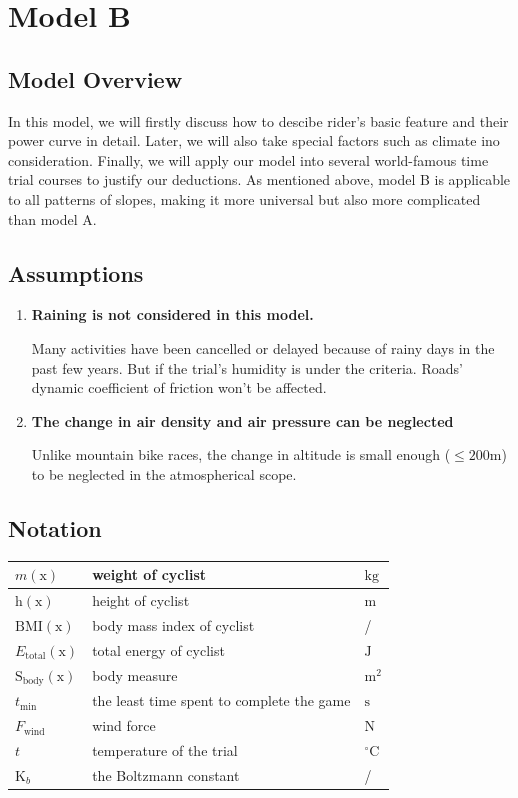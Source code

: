 \documentclass{article}
\begin{document}
	\section{Model B}
		\subsection{Model Overview}
			In this model, we will firstly discuss how to descibe rider's basic feature and their power curve in detail. Later, we will also take special factors such as climate ino consideration. Finally, we will apply our model into several world-famous time trial courses to justify our deductions. As mentioned above, model B is applicable to all patterns of slopes, making it more universal but also more complicated than model A.
		\subsection{Assumptions}
			\begin{enumerate}
				\item	\textbf{Raining is not considered in this model.}

						Many activities have been cancelled or delayed because of rainy days in the past few years. But if the trial's humidity is under the criteria. Roads' dynamic coefficient of friction won't be affected.
				\item \textbf{The change in air density and air pressure can be neglected}

						Unlike mountain bike races, the change in altitude is small enough (\(\leq 200\mathrm{m}\)) to be neglected in the atmospherical scope.

			\end{enumerate}
		\subsection{Notation}
			\begin{tabular}{|l|l|l|}
				\hline
				$m(\mathrm{x})$&weight of cyclist&$\mathrm{kg}$\\
				\hline
				$\mathrm{h}(\mathrm{x})$&height of cyclist&$\mathrm{m}$\\
				\hline
				$\mathrm{BMI}(\mathrm{x})$&body mass index of cyclist&/\\
				\hline
				$ E _\mathrm{total} (\mathrm{x})$&total energy of cyclist&$\mathrm{J}$\\
				\hline
				$\mathrm{S}_\mathrm{body}(\mathrm{x})$&body measure&$\mathrm{m}^2$\\
				\hline
				$t_\mathrm{min}$&the least time spent to complete the game&$\mathrm{s}$\\
				\hline
				$F_\mathrm{wind}$&wind force&$\mathrm{N}$\\
				\hline
				$t$&temperature of the trial&$^\circ\mathrm{C}$\\
				\hline
				$\mathrm{K}_ b $&the Boltzmann constant&/\\
				\hline
			\end{tabular}
\end{document}
